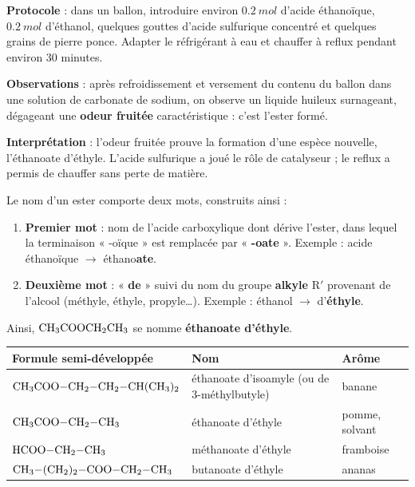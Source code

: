 \documentclass[11pt]{article}
\newcounter{popsec}
\newcounter{popsub}
\newcommand{\courssub}[1]{%
  \stepcounter{popsub}%
  \par\vspace{9pt}\noindent{\popxbold\fontsize{11.5}{13}\selectfont\color{popink}{\color{poporange}\thepopsec.\thepopsub}\hspace{6pt}#1}\par\nopagebreak\vspace{4pt}
}
\begin{document}
\begin{experience}
\textbf{Protocole} : dans un ballon, introduire environ $\SI{0,2}{mol}$ d'acide éthanoïque, $\SI{0,2}{mol}$ d'éthanol, quelques gouttes d'acide sulfurique concentré et quelques grains de pierre ponce. Adapter le réfrigérant à eau et chauffer à reflux pendant environ 30 minutes.\par
\textbf{Observations} : après refroidissement et versement du contenu du ballon dans une solution de carbonate de sodium, on observe un liquide huileux surnageant, dégageant une \textbf{odeur fruitée} caractéristique : c'est l'ester formé.\par
\textbf{Interprétation} : l'odeur fruitée prouve la formation d'une espèce nouvelle, l'éthanoate d'éthyle. L'acide sulfurique a joué le rôle de catalyseur ; le reflux a permis de chauffer sans perte de matière.
\end{experience}

\courssub{Nomenclature des esters}

\begin{methode}
Le nom d'un ester comporte deux mots, construits ainsi :
\begin{enumerate}
\item \textbf{Premier mot} : nom de l'acide carboxylique dont dérive l'ester, dans lequel la terminaison « -oïque » est remplacée par « \textbf{-oate} ». Exemple : acide éthanoïque $\rightarrow$ éthano\textbf{ate}.
\item \textbf{Deuxième mot} : « \textbf{de} » suivi du nom du groupe \textbf{alkyle} $\mathrm{R'}$ provenant de l'alcool (méthyle, éthyle, propyle\ldots). Exemple : éthanol $\rightarrow$ d'\textbf{éthyle}.
\end{enumerate}
Ainsi, $\ce{CH3COOCH2CH3}$ se nomme \textbf{éthanoate d'éthyle}.
\end{methode}

\begin{exemplebox}
\begin{center}
\begin{tabularx}{\linewidth}{|l|X|X|}
\hline
\rowcolor{popblueL} \textbf{Formule semi-développée} & \textbf{Nom} & \textbf{Arôme} \\
\hline
$\ce{CH3COO-CH2-CH2-CH(CH3)2}$ & éthanoate d'isoamyle (ou de 3-méthylbutyle) & banane \\
\hline
$\ce{CH3COO-CH2-CH3}$ & éthanoate d'éthyle & pomme, solvant \\
\hline
$\ce{HCOO-CH2-CH3}$ & méthanoate d'éthyle & framboise \\
\hline
$\ce{CH3-(CH2)2-COO-CH2-CH3}$ & butanoate d'éthyle & ananas \\
\hline
\end{tabularx}
\end{center}
\end{exemplebox}
\end{document}
